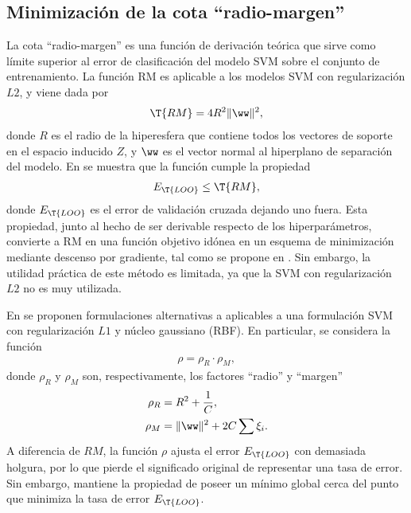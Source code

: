 %
%
\subsection{Minimización de la cota ``radio-margen''}
%
La cota ``radio-margen'' es una función de derivación teórica
que sirve como límite superior al error de clasificación
 del modelo SVM sobre el conjunto de
entrenamiento. La función RM es aplicable a los modelos
SVM con regularización $L2$, y viene dada por
\begin{align}
  \T{RM} = 4R^2 \|\ww\|^2,
\end{align}
%
donde $R$ es el radio de la hiperesfera que contiene todos los
vectores de soporte en el espacio inducido $Z$, y $\ww$ es el vector
normal al hiperplano de separación del modelo.
En \cite{vapnik} se muestra que la función cumple la propiedad
%
\begin{align}
  E_{\T{LOO}} \leq \T{RM},
\end{align}
%
donde $E_{\T{LOO}}$ es el error de validación cruzada dejando uno
fuera. Esta propiedad, junto al hecho de ser derivable respecto de los
hiperparámetros, convierte a RM en una función objetivo idónea en un esquema
de minimización mediante descenso por gradiente, tal como se propone en \cite{chapelle}.
Sin embargo, la utilidad práctica de este método es limitada, ya que
la SVM con regularización $L2$ no es muy utilizada.

En \cite{chung} se proponen formulaciones alternativas a aplicables
a una formulación SVM con regularización $L1$ y núcleo gaussiano
(RBF). En particular, se considera la función
%
\begin{align}
  \rho = \rho_R \cdot \rho_M,
\end{align}
%
donde $\rho_R$ y $\rho_M$ son, respectivamente, los factores ``radio'' y ``margen''
%
\begin{align}
  \rho_R &= R^2+\frac{1}{C}, \\
  \rho_M &= \|\ww\|^2+2C\sum\xi_i.
\end{align}
%
A diferencia de ${RM}$, la función $\rho$ ajusta el error $E_{\T{LOO}}$
con demasiada holgura, por lo que pierde el significado original de
representar una tasa de error. Sin embargo, mantiene la propiedad de
poseer un mínimo global cerca del punto que minimiza la tasa de error $E_{\T{LOO}}$.
